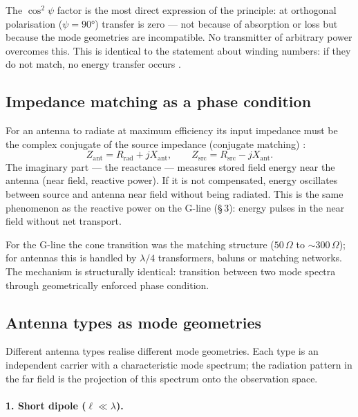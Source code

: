 The $\cos^2\psi$ factor is the most direct expression of the principle: at
orthogonal polarisation ($\psi=90°$) transfer is zero --- not because of
absorption or loss but because the mode geometries are incompatible. No
transmitter of arbitrary power overcomes this. This is identical to the
statement about winding numbers: if they do not match, no energy transfer
occurs \SM.

\subsection*{Impedance matching as a phase condition}

For an antenna to radiate at maximum efficiency its input impedance must
be the complex conjugate of the source impedance (conjugate matching) \EM:
\[
  Z_\mathrm{ant} = R_\mathrm{rad} + jX_\mathrm{ant}, \qquad
  Z_\mathrm{src} = R_\mathrm{src} - jX_\mathrm{ant}.
\]
The imaginary part --- the reactance --- measures stored field energy near
the antenna (near field, reactive power). If it is not compensated, energy
oscillates between source and antenna near field without being radiated.
This is the same phenomenon as the reactive power on the G-line (\S\,3):
energy pulses in the near field without net transport.

For the G-line the cone transition was the matching structure
($50\,\Omega$ to ${\sim}300\,\Omega$); for antennas this is handled by
$\lambda/4$ transformers, baluns or matching networks. The mechanism is
structurally identical: transition between two mode spectra through
geometrically enforced phase condition.

\subsection*{Antenna types as mode geometries}

Different antenna types realise different mode geometries. Each type is
an independent carrier with a characteristic mode spectrum; the radiation
pattern in the far field is the projection of this spectrum onto the
observation space.

\paragraph{1. Short dipole ($\ell \ll \lambda$).}

